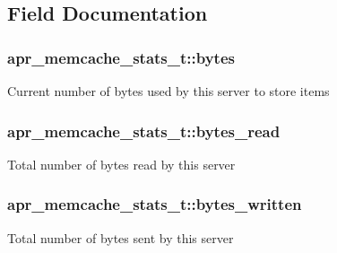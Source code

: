 \subsection{Field Documentation}
\subsubsection[{\texorpdfstring{bytes}{bytes}}]{ apr\+\_\+memcache\+\_\+stats\+\_\+t\+::bytes}\hypertarget{structapr__memcache__stats__t_a327ed9d43d6df23337101eda379a7870}{}\label{structapr__memcache__stats__t_a327ed9d43d6df23337101eda379a7870}
Current number of bytes used by this server to store items 
\subsubsection[{\texorpdfstring{bytes\+\_\+read}{bytes_read}}]{ apr\+\_\+memcache\+\_\+stats\+\_\+t\+::bytes\+\_\+read}\hypertarget{structapr__memcache__stats__t_acf5d7892543403de8a48e9276d94b5af}{}\label{structapr__memcache__stats__t_acf5d7892543403de8a48e9276d94b5af}
Total number of bytes read by this server 
\subsubsection[{\texorpdfstring{bytes\+\_\+written}{bytes_written}}]{ apr\+\_\+memcache\+\_\+stats\+\_\+t\+::bytes\+\_\+written}\hypertarget{structapr__memcache__stats__t_a05f5b9a19c330460fe66b79746989094}{}\label{structapr__memcache__stats__t_a05f5b9a19c330460fe66b79746989094}
Total number of bytes sent by this server 
